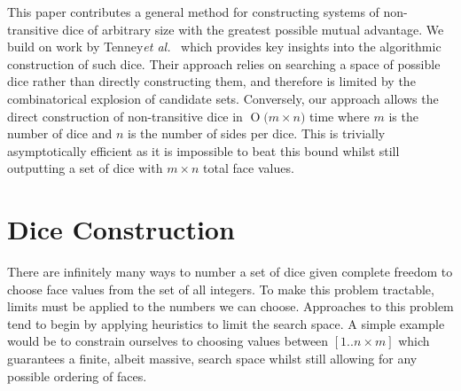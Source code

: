 \documentclass[a4paper,twocolumn]{article}
\newcommand{\BigO}[1]{\ensuremath{\operatorname{O}\bigl(#1\bigr)}}
\begin{document}
\begin{table}
\begin{center}

	 \qquad
	 
\end{center}
\caption{Different Representations of Efron's Dice}
\end{table}
This paper contributes a general method for constructing systems of non-transitive dice of arbitrary size with the greatest possible mutual advantage. We build on work by Tenney{\it et al.}~\cite{tenney1976non} which provides key insights into the algorithmic construction of such dice. Their approach relies on searching a space of possible dice rather than directly constructing them, and therefore is limited by the combinatorical explosion of candidate sets. Conversely, our approach allows the direct construction of non-transitive dice in \BigO{m\times n} time where $m$ is the number of dice and $n$ is the number of sides per dice. This is trivially asymptotically efficient as it is impossible to beat this bound whilst still outputting a set of dice with $m\times n$ total face values.

\section*{Dice Construction}
There are infinitely many ways to number a set of dice given complete freedom to choose face values from the set of all integers. To make this problem tractable, limits must be applied to the numbers we can choose. Approaches to this problem tend to begin by applying heuristics to limit the search space. A simple example would be to constrain ourselves to choosing values between $[1 .. n\times m]$ which guarantees a finite, albeit massive, search space whilst still allowing for any possible ordering of faces.
\end{document}
